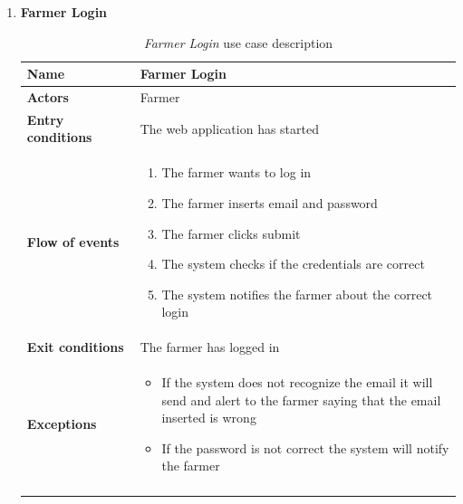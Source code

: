 \begin{enumerate}
    \item \textbf{Farmer Login}
        \begin{longtable}{p{0.26\linewidth}p{0.75\linewidth}}
            \toprule
            \textbf{Name} & \textbf{Farmer Login} \\
            \midrule
            \textbf{Actors} & Farmer \\
            \midrule
            \textbf{Entry conditions} & The web application has started\\
            \midrule
            \textbf{Flow of events} & 
            \begin{enumerate}
                \item The farmer wants to log in
                \item The farmer inserts email and password
                \item The farmer clicks submit
                \item The system checks if the credentials are correct
                \item The system notifies the farmer about the correct login
            \end{enumerate} \\
            \midrule
            \textbf{Exit conditions} & The farmer has logged in\\
            \midrule
            \textbf{Exceptions} & 
            \begin{itemize}
                \item If the system does not recognize the email it will send and alert to the farmer saying that the email inserted is wrong
                \item If the password is not correct the system will notify the farmer
            \end{itemize} \\
            \bottomrule
            \caption{\emph{Farmer Login} use case description}
        \end{longtable}
        

\end{enumerate}
